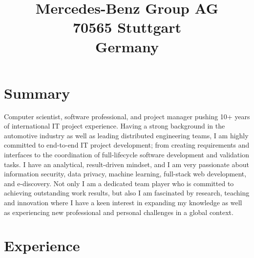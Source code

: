 \documentclass[11pt,a4paper,sans]{moderncv}
\title{\large Mercedes-Benz Group AG \\ 70565 Stuttgart \\ Germany}
\begin{document}
\makecvtitle

\section{Summary}
Computer scientist, software professional, and project manager pushing 10+ years of international IT
project experience. Having a strong background in the automotive industry as well as leading
distributed engineering teams, I am highly committed to end-to-end IT project development; \linebreak from
creating requirements and interfaces to the coordination of full-lifecycle software development and
validation tasks. I have an analytical, result-driven mindset, and I am very passionate about
information security, data privacy, machine learning, full-stack web development, and e-discovery. Not only I am a
dedicated team player who is committed to achieving outstanding work results, but also I am
fascinated by research, teaching and innovation where I have a keen interest in expanding my knowledge
as well as experiencing new professional and personal challenges in a global context.

\section{Experience}
\end{document}
